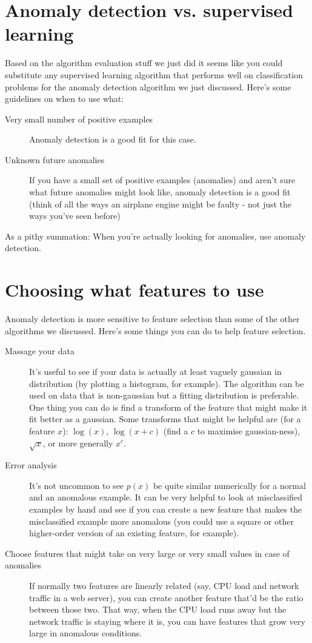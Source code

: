 \section{Anomaly detection vs. supervised learning}

Based on the algorithm evaluation stuff we just did it seems like you could substitute any supervised learning algorithm that performs well on classification problems for the anomaly detection algorithm we just discussed. Here's some guidelines on when to use what:

\begin{description}
\item[Very small number of positive examples] Anomaly detection is a good fit for this case.
\item[Unknown future anomalies] If you have a small set of positive examples (anomalies) and aren't sure what future anomalies might look like, anomaly detection is a good fit (think of all the ways an airplane engine might be faulty - not just the ways you've seen before)

\end{description}

As a pithy summation: When you're actually looking for anomalies, use anomaly detection. 

\section{Choosing what features to use}

Anomaly detection is more sensitive to feature selection than some of the other algorithms we discussed. Here's some things you can do to help feature selection.

\begin{description}
\item[Massage your data] It's useful to see if your data is actually at least vaguely gaussian in distribution (by plotting a histogram, for example). The algorithm can be used on data that is non-gaussian but a fitting distribution is preferable. One thing you can do is find a transform of the feature that might make it fit better as a gaussian. Some transforms that might be helpful are (for a feature $x$): $\log(x)$, $\log(x + c)$ (find a $c$ to maximise gaussian-ness), $\sqrt{x}$, or more generally $x^c$.
\item[Error analysis] It's not uncommon to see $p(x)$ be quite similar numerically for a normal and an anomalous example. It can be very helpful to look at misclassified examples by hand and see if you can create a new feature that makes the misclassified example more anomalous (you could use a square or other higher-order version of an existing feature, for example).
\item[Choose features that might take on very large or very small values in case of anomalies] If normally two features are linearly related (say, CPU load and network traffic in a web server), you can create another feature that'd be the ratio between those two. That way, when the CPU load runs away but the network traffic is staying where it is, you can have features that grow very large in anomalous conditions.
\end{description}

